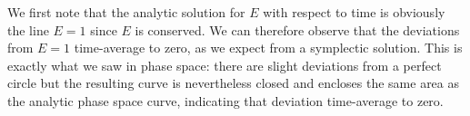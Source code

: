 \documentclass[11pt]{article}
\begin{document}
We first note that the analytic solution for $E$ with respect to time is obviously the line $E=1$ since $E$ is conserved. We can therefore observe that the deviations from $E=1$ time-average to zero, as we expect from a symplectic solution. This is exactly what we saw in phase space: there are slight deviations from a perfect circle but the resulting curve is nevertheless closed and encloses the same area as the analytic phase space curve, indicating that deviation time-average to zero.
\end{document}
